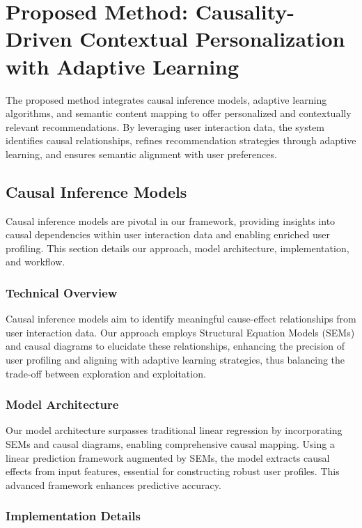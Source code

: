 \section{Proposed Method: Causality-Driven Contextual Personalization with Adaptive Learning}

The proposed method integrates causal inference models, adaptive learning algorithms, and semantic content mapping to offer personalized and contextually relevant recommendations. By leveraging user interaction data, the system identifies causal relationships, refines recommendation strategies through adaptive learning, and ensures semantic alignment with user preferences.

\subsection{Causal Inference Models}

Causal inference models are pivotal in our framework, providing insights into causal dependencies within user interaction data and enabling enriched user profiling. This section details our approach, model architecture, implementation, and workflow.

\subsubsection{Technical Overview}

Causal inference models aim to identify meaningful cause-effect relationships from user interaction data. Our approach employs Structural Equation Models (SEMs) and causal diagrams to elucidate these relationships, enhancing the precision of user profiling and aligning with adaptive learning strategies, thus balancing the trade-off between exploration and exploitation.

\subsubsection{Model Architecture}

Our model architecture surpasses traditional linear regression by incorporating SEMs and causal diagrams, enabling comprehensive causal mapping. Using a linear prediction framework augmented by SEMs, the model extracts causal effects from input features, essential for constructing robust user profiles. This advanced framework enhances predictive accuracy.

\subsubsection{Implementation Details}



